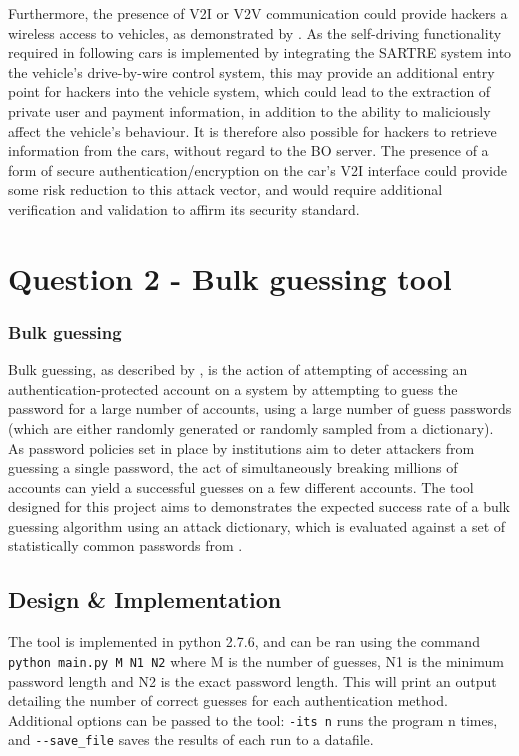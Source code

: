 \documentclass[british,11pt,a4paper]{article}
\begin{document}
Furthermore, the presence of V2I or V2V communication could provide hackers a wireless access to vehicles, as demonstrated by \citet{Curri2015-zo}. As the self-driving functionality required in following cars is implemented by integrating the SARTRE system into the vehicle’s drive-by-wire control system, this may provide an additional entry point for hackers into the vehicle system, which could lead to the extraction of private user and payment information, in addition to the ability to maliciously affect the vehicle’s behaviour. It is therefore also possible for hackers to retrieve information from the cars, without regard to the BO server. The presence of a form of secure authentication/encryption on the car’s V2I interface could provide some risk reduction to this attack vector, and would require additional verification and validation to affirm its security standard.





\clearpage


\section{Question 2 - Bulk guessing tool}

\subsubsection{Bulk guessing}
Bulk guessing, as described by \citet{Florencio2007-yp}, is the action of attempting of accessing an authentication-protected account on a system by attempting to guess the password for a large number of accounts, using a large number of guess passwords (which are either randomly generated or randomly sampled from a dictionary). As password policies set in place by institutions aim to deter attackers from guessing a single password, the act of simultaneously breaking millions of accounts can yield a successful guesses on a few different accounts. The tool designed for this project aims to demonstrates the expected success rate of a bulk guessing algorithm using an attack dictionary, which is evaluated against a set of statistically common passwords from \citet{Cubrilovic2009-wu}.

\subsection{Design \& Implementation}
The tool is implemented in python 2.7.6, and can be ran using the command \lstinline{python main.py M N1 N2} where M is the number of guesses, N1 is the minimum password length and N2 is the exact password length. This will print an output detailing the number of correct guesses for each authentication method. Additional options can be passed to the tool: \lstinline{-its n} runs the program n times, and \lstinline{--save_file} saves the results of each run to a datafile.
\end{document}
